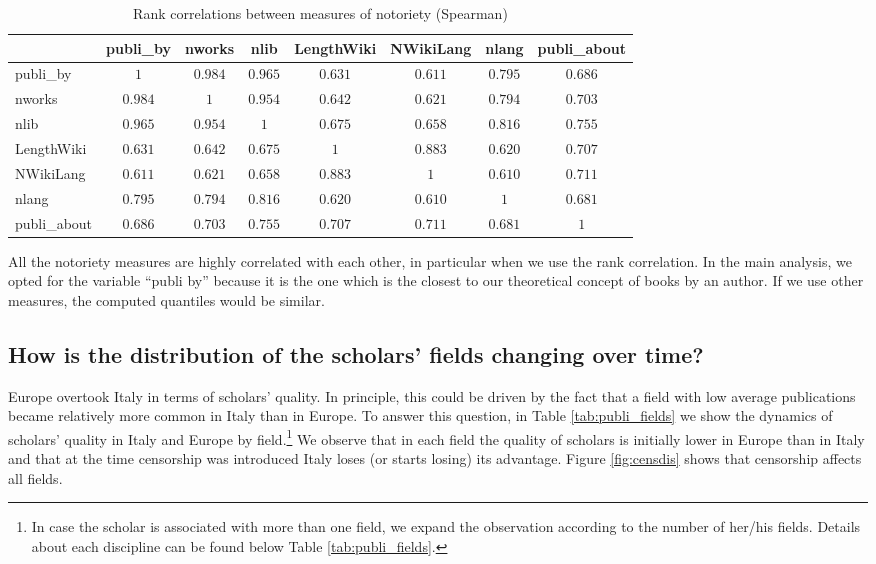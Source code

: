 \begin{table}[!htbp] \centering
\begin{tabular}{lccccccc}
\toprule
 & publi\_by & nworks & nlib & LengthWiki & NWikiLang & nlang & publi\_about \\
\midrule
publi\_by & $1$ & $0.984$ & $0.965$ & $0.631$ & $0.611$ & $0.795$ & $0.686$ \\
nworks & $0.984$ & $1$ & $0.954$ & $0.642$ & $0.621$ & $0.794$ & $0.703$ \\
nlib & $0.965$ & $0.954$ & $1$ & $0.675$ & $0.658$ & $0.816$ & $0.755$ \\
LengthWiki & $0.631$ & $0.642$ & $0.675$ & $1$ & $0.883$ & $0.620$ & $0.707$ \\
NWikiLang & $0.611$ & $0.621$ & $0.658$ & $0.883$ & $1$ & $0.610$ & $0.711$ \\
nlang & $0.795$ & $0.794$ & $0.816$ & $0.620$ & $0.610$ & $1$ & $0.681$ \\
publi\_about & $0.686$ & $0.703$ & $0.755$ & $0.707$ & $0.711$ & $0.681$ & $1$ \\
\bottomrule
\end{tabular}
  \caption{Rank correlations between measures of notoriety (Spearman)}
  \label{tab:cor2}
\end{table}


All the notoriety measures are highly correlated with each other, in particular when we use the rank correlation. In the main analysis, we opted for the variable ``publi by'' because it is the one which is the closest to our theoretical concept of books by an author. If we use other measures, the computed  quantiles would be similar.


\clearpage
\subsection{How is the distribution of the scholars' fields changing over time?}\label{appendix:data3}

Europe overtook Italy in terms of scholars' quality. In principle, this could be driven by the fact that a field with low average publications became relatively more common in Italy than in Europe. To answer this question, in Table \ref{tab:publi_fields} we show the dynamics of scholars' quality in Italy and Europe by field.\footnote{In case the scholar is associated with more than one field, we expand the observation according to the number of her/his fields. Details about each discipline can be found below Table \ref{tab:publi_fields}.} We observe that in each field the quality of scholars is initially lower in Europe than in Italy and that at the time censorship was introduced Italy loses (or starts losing) its advantage. Figure \ref{fig:censdis} shows that censorship affects all fields.

